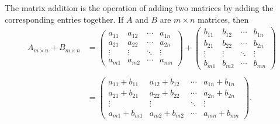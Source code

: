 \documentclass{subfile}
\begin{document}
	\begin{definition}
		The matrix addition is the operation of adding two matrices by adding the corresponding entries together. If $A$ and $B$ are $m \times n$ matrices, then
		\begin{align*}
	{A_{m \times n}} + {B_{m \times n}} &= \begin{pmatrix}
		{{a_{11}}}&{{a_{12}}}& \cdots &{{a_{1n}}}\\
		{{a_{21}}}&{{a_{22}}}& \cdots &{{a_{2n}}}\\
		\vdots & \vdots & \ddots & \vdots \\
		{{a_{m1}}}&{{a_{m2}}}& \cdots &{{a_{mn}}}
		\end{pmatrix} + \begin{pmatrix}
		{{b_{11}}}&{{b_{12}}}& \cdots &{{b_{1n}}}\\
		{{b_{21}}}&{{b_{22}}}& \cdots &{{b_{2n}}}\\
		\vdots & \vdots & \ddots & \vdots \\
		{{b_{m1}}}&{{b_{m2}}}& \cdots &{{b_{mn}}}
		\end{pmatrix}\\
	\\
	&= \begin{pmatrix}
		{{a_{11}} + {b_{11}}}&{{a_{12}} + {b_{12}}}& \cdots &{{a_{1n}} + {b_{1n}}}\\
		{{a_{21}} + {b_{21}}}&{{a_{22}} + {b_{22}}}& \cdots &{{a_{2n}} + {b_{2n}}}\\
		\vdots & \vdots & \ddots & \vdots \\
		{{a_{m1}} + {b_{m1}}}&{{a_{m2}} + {b_{m2}}}& \cdots &{{a_{mn}} + {b_{mn}}}
		\end{pmatrix}.
		\end{align*}


	\end{definition}


\end{document}
